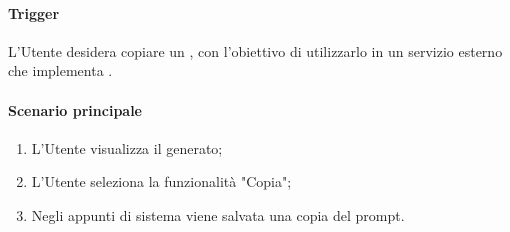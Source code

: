 \paragraph*{Trigger}
L'Utente desidera copiare un , con l'obiettivo di utilizzarlo in un servizio esterno che implementa .

\paragraph*{Scenario principale}
\begin{enumerate}
  \item L'Utente visualizza il  generato;
  \item L'Utente seleziona la funzionalità "Copia";
  \item Negli appunti di sistema viene salvata una copia del prompt.
\end{enumerate}